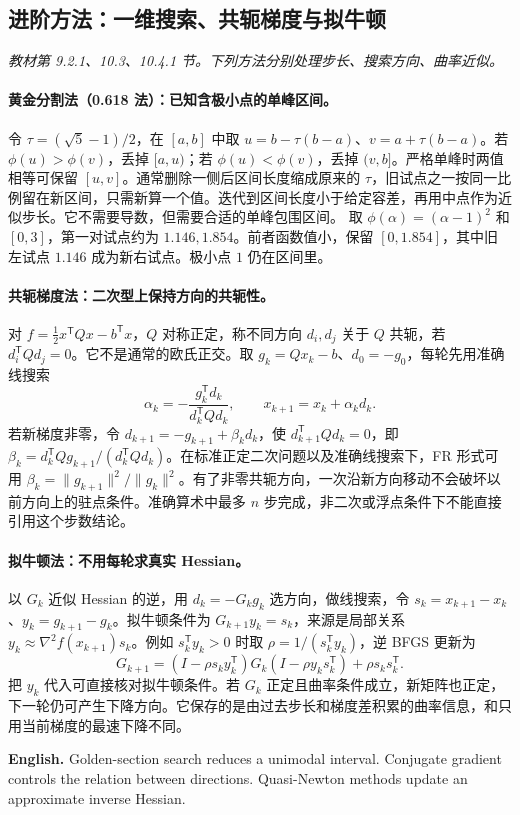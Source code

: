 \documentclass[UTF8,11pt,a4paper]{ctexart}
\newcommand{\EN}[1]{\par\noindent \textbf{English.} #1\par}
\begin{document}
\clearpage
\subsection*{进阶方法：一维搜索、共轭梯度与拟牛顿}
\noindent\textit{教材第 9.2.1、10.3、10.4.1 节。下列方法分别处理步长、搜索方向、曲率近似。}
\paragraph{黄金分割法（0.618 法）：已知含极小点的单峰区间。}
令 $\tau=(\sqrt5-1)/2$，在 $[a,b]$ 中取 $u=b-\tau(b-a)$、$v=a+\tau(b-a)$。若 $\phi(u)>\phi(v)$，丢掉 $[a,u)$；若 $\phi(u)<\phi(v)$，丢掉 $(v,b]$。严格单峰时两值相等可保留 $[u,v]$。通常删除一侧后区间长度缩成原来的 $\tau$，旧试点之一按同一比例留在新区间，只需新算一个值。迭代到区间长度小于给定容差，再用中点作为近似步长。它不需要导数，但需要合适的单峰包围区间。
取 $\phi(\alpha)=(\alpha-1)^2$ 和 $[0,3]$，第一对试点约为 $1.146,1.854$。前者函数值小，保留 $[0,1.854]$，其中旧左试点 $1.146$ 成为新右试点。极小点 $1$ 仍在区间里。

\paragraph{共轭梯度法：二次型上保持方向的共轭性。}
对 $f=\tfrac12x^{\mathsf T}Qx-b^{\mathsf T}x$，$Q$ 对称正定，称不同方向 $d_i,d_j$ 关于 $Q$ 共轭，若 $d_i^{\mathsf T}Qd_j=0$。它不是通常的欧氏正交。取 $g_k=Qx_k-b$、$d_0=-g_0$，每轮先用准确线搜索
\[
  \alpha_k=-\frac{g_k^{\mathsf T}d_k}{d_k^{\mathsf T}Qd_k},\qquad x_{k+1}=x_k+\alpha_kd_k .
\]
若新梯度非零，令 $d_{k+1}=-g_{k+1}+\beta_kd_k$，使 $d_{k+1}^{\mathsf T}Qd_k=0$，即
$\beta_k=d_k^{\mathsf T}Qg_{k+1}/(d_k^{\mathsf T}Qd_k)$。在标准正定二次问题以及准确线搜索下，FR 形式可用 $\beta_k=\|g_{k+1}\|^2/\|g_k\|^2$。有了非零共轭方向，一次沿新方向移动不会破坏以前方向上的驻点条件。准确算术中最多 $n$ 步完成，非二次或浮点条件下不能直接引用这个步数结论。

\paragraph{拟牛顿法：不用每轮求真实 Hessian。}
以 $G_k$ 近似 Hessian 的逆，用 $d_k=-G_k g_k$ 选方向，做线搜索，令 $s_k=x_{k+1}-x_k$、$y_k=g_{k+1}-g_k$。拟牛顿条件为 $G_{k+1}y_k=s_k$，来源是局部关系 $y_k\approx\nabla^2 f(x_{k+1})s_k$。例如 $s_k^{\mathsf T}y_k>0$ 时取 $\rho=1/(s_k^{\mathsf T}y_k)$，逆 BFGS 更新为
\[
 G_{k+1}=(I-\rho s_k y_k^{\mathsf T})G_k(I-\rho y_k s_k^{\mathsf T})
              +\rho s_k s_k^{\mathsf T}.
\]
把 $y_k$ 代入可直接核对拟牛顿条件。若 $G_k$ 正定且曲率条件成立，新矩阵也正定，下一轮仍可产生下降方向。它保存的是由过去步长和梯度差积累的曲率信息，和只用当前梯度的最速下降不同。
\EN{Golden-section search reduces a unimodal interval. Conjugate gradient controls the relation between directions. Quasi-Newton methods update an approximate inverse Hessian.}
\clearpage
\end{document}
